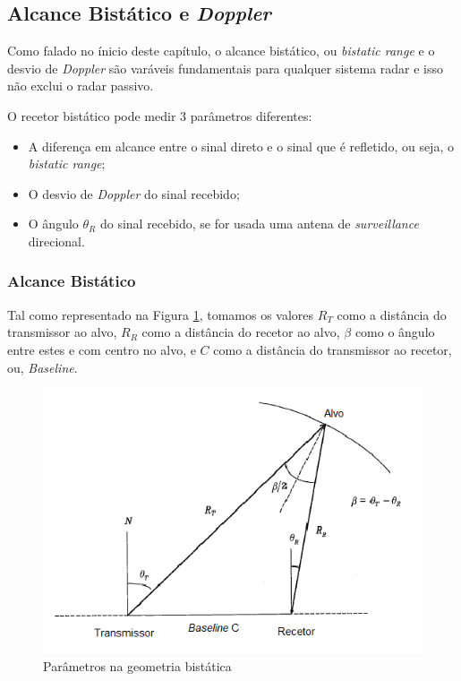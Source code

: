 \subsection{Alcance Bistático e \textit{Doppler}}
Como falado no ínicio deste capítulo, o alcance bistático, ou \textit{bistatic range} e o desvio de \textit{Doppler} são varáveis fundamentais para qualquer sistema radar e isso não exclui o radar passivo.\par 
O recetor bistático pode medir 3 parâmetros diferentes:
\begin{itemize}
\item A diferença em alcance entre o sinal direto e o sinal que é refletido, ou seja, o \textit{bistatic range};
\item O desvio de \textit{Doppler} do sinal recebido;
\item O ângulo $\theta_{R}$ do sinal recebido, se for usada uma antena de \textit{surveillance }direcional.
\end{itemize}

\subsubsection*{Alcance Bistático} 
Tal como representado na Figura \ref{fig:geom}, tomamos os valores $R_{T}$ como a distância do transmissor ao alvo,  $R_{R}$ como a distância do recetor ao alvo,  $\beta$ como o ângulo entre estes e com centro no alvo, e  $C$ como a distância do transmissor ao recetor, ou, \textit{Baseline}.\par


\begin{figure}[h]
\centering
\includegraphics[scale=0.9]{chapters/ch2/assets/geom}
\caption[Parâmetros na geometria bistática]{Parâmetros na geometria bistática}
\label{fig:geom}
\end{figure}

